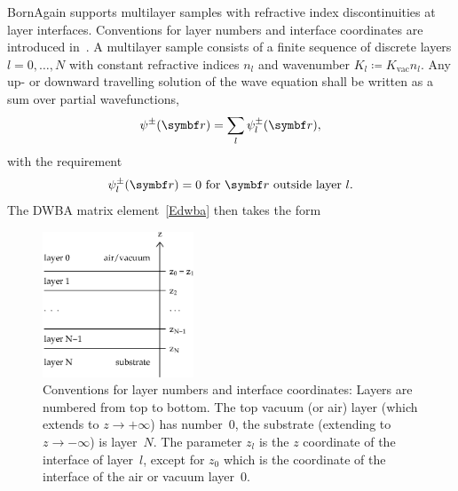 BornAgain supports multilayer samples
with refractive index discontinuities at layer interfaces.
Conventions for layer numbers and interface coordinates are
introduced in~.
A multilayer sample consists of a finite sequence of discrete layers
$l=0,\ldots,N$
%
with constant refractive indices $n_l$
%
%
and wavenumber $K_l\coloneqq K_\text{vac} n_l$.
Any up- or downward travelling solution of the wave equation shall be written
as a sum over partial wavefunctions,
\begin{equation}\label{Epsipmsuml}
  \psi^\pm(\r) = \sum_l \psi_l^\pm(\r),
\end{equation}
with the requirement
\begin{equation}\label{Epsipmloutside}
   \psi_l^\pm(\r) = 0 \text{~for $\r$ outside layer~$l$.}
\end{equation}
The DWBA matrix element~\cref{Edwba} then takes the form

\begin{figure}[tb]
\begin{center}
\includegraphics[width=0.4\textwidth]{fig/drawing/multilayer_z_conventions.ps}
\end{center}
\caption{Conventions for layer numbers and interface coordinates:
Layers are numbered from top to bottom.
The top vacuum (or air) layer (which extends to $z\to+\infty$) has number~0,
the substrate (extending to $z\to-\infty$) is layer~$N$.
%
%
%
The parameter $z_l$
%
is the $z$ coordinate of the  interface of layer~$l$,
%
%
%
except for $z_0$ which is the coordinate of the  interface
of the air or vacuum layer~0.}
\label{Fdefz}
\end{figure}

